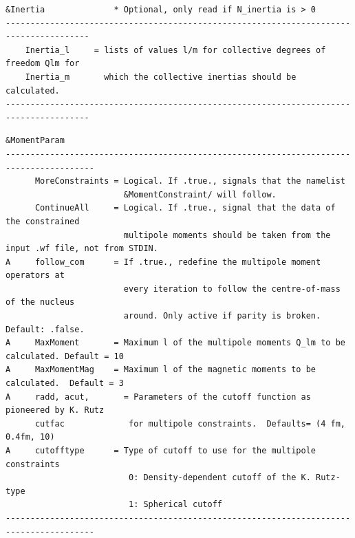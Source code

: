 \documentclass[print,amsmath,amssymb,aps,prc,nofootinbib,notitlepage]{revtex4-1}
\begin{document}
\begin{Verbatim}
&Inertia              * Optional, only read if N_inertia is > 0
---------------------------------------------------------------------------------------
    Inertia_l     = lists of values l/m for collective degrees of freedom Qlm for
    Inertia_m       which the collective inertias should be calculated.
---------------------------------------------------------------------------------------
\end{Verbatim}

\begin{Verbatim}
&MomentParam
----------------------------------------------------------------------------------------
      MoreConstraints = Logical. If .true., signals that the namelist 
                        &MomentConstraint/ will follow.
      ContinueAll     = Logical. If .true., signal that the data of the constrained 
                        multipole moments should be taken from the input .wf file, not from STDIN.
A     follow_com      = If .true., redefine the multipole moment operators at
                        every iteration to follow the centre-of-mass of the nucleus
                        around. Only active if parity is broken. Default: .false.
A     MaxMoment       = Maximum l of the multipole moments Q_lm to be calculated. Default = 10
A     MaxMomentMag    = Maximum l of the magnetic moments to be calculated.  Default = 3
A     radd, acut,       = Parameters of the cutoff function as pioneered by K. Rutz
      cutfac             for multipole constraints.  Defaults= (4 fm, 0.4fm, 10)                  
A     cutofftype      = Type of cutoff to use for the multipole constraints
                         0: Density-dependent cutoff of the K. Rutz-type
                         1: Spherical cutoff
----------------------------------------------------------------------------------------
\end{Verbatim}
\clearpage
\end{document}
